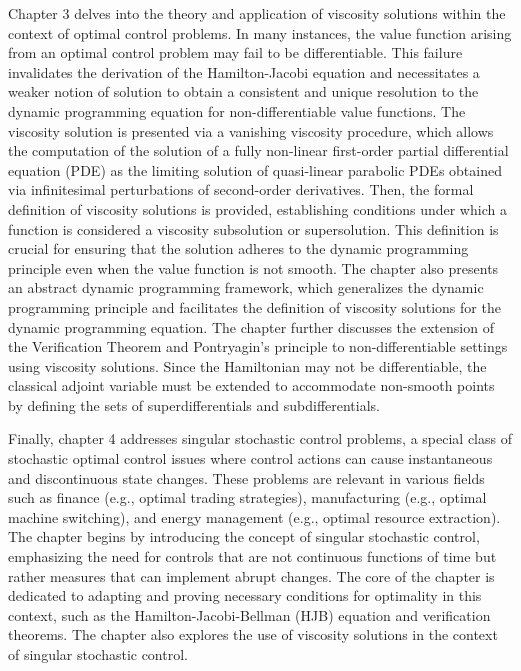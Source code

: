\documentclass[12pt,a4paper,oneside]{book}
\numberwithin{theorem}{section}
\numberwithin{definition}{section}
\numberwithin{example}{section}
\numberwithin{exercise}{section}
\begin{document}
Chapter 3 delves into the theory and application of viscosity solutions within the context of optimal control problems. In many instances, the value function arising from an optimal control problem may fail to be differentiable. This failure invalidates the derivation of the Hamilton-Jacobi equation and necessitates a weaker notion of solution to obtain a consistent and unique resolution to the dynamic programming equation for non-differentiable value functions. The viscosity solution is presented via a vanishing viscosity procedure, which allows the computation of the solution of a fully non-linear first-order partial differential equation (PDE) as the limiting solution of quasi-linear parabolic PDEs obtained via infinitesimal perturbations of second-order derivatives. Then, the formal definition of viscosity solutions is provided, establishing conditions under which a function is considered a viscosity subsolution or supersolution. This definition is crucial for ensuring that the solution adheres to the dynamic programming principle even when the value function is not smooth. The chapter also presents an abstract dynamic programming framework, which generalizes the dynamic programming principle and facilitates the definition of viscosity solutions for the dynamic programming equation. The chapter further discusses the extension of the Verification Theorem and Pontryagin's principle to non-differentiable settings using viscosity solutions. Since the Hamiltonian may not be differentiable, the classical adjoint variable must be extended to accommodate non-smooth points by defining the sets of superdifferentials and subdifferentials.

Finally, chapter 4 addresses singular stochastic control problems, a special class of stochastic optimal control issues where control actions can cause instantaneous and discontinuous state changes. These problems are relevant in various fields such as finance (e.g., optimal trading strategies), manufacturing (e.g., optimal machine switching), and energy management (e.g., optimal resource extraction). The chapter begins by introducing the concept of singular stochastic control, emphasizing the need for controls that are not continuous functions of time but rather measures that can implement abrupt changes. The core of the chapter is dedicated to adapting and proving necessary conditions for optimality in this context, such as the Hamilton-Jacobi-Bellman (HJB) equation and verification theorems. The chapter also explores the use of viscosity solutions in the context of singular stochastic control. 
\end{document}
